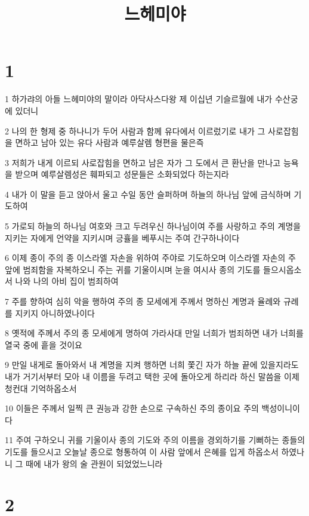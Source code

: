 

\title{느헤미야}


\chapter{1}

\par 1 하가랴의 아들 느헤미야의 말이라 아닥사스다왕 제 이십년 기슬르월에 내가 수산궁에 있더니
\par 2 나의 한 형제 중 하나니가 두어 사람과 함께 유다에서 이르렀기로 내가 그 사로잡힘을 면하고 남아 있는 유다 사람과 예루살렘 형편을 물은즉
\par 3 저희가 내게 이르되 사로잡힘을 면하고 남은 자가 그 도에서 큰 환난을 만나고 능욕을 받으며 예루살렘성은 훼파되고 성문들은 소화되었다 하는지라
\par 4 내가 이 말을 듣고 앉아서 울고 수일 동안 슬퍼하며 하늘의 하나님 앞에 금식하며 기도하여
\par 5 가로되 하늘의 하나님 여호와 크고 두려우신 하나님이여 주를 사랑하고 주의 계명을 지키는 자에게 언약을 지키시며 긍휼을 베푸시는 주여 간구하나이다
\par 6 이제 종이 주의 종 이스라엘 자손을 위하여 주야로 기도하오며 이스라엘 자손의 주 앞에 범죄함을 자복하오니 주는 귀를 기울이시며 눈을 여시사 종의 기도를 들으시옵소서 나와 나의 아비 집이 범죄하여
\par 7 주를 향하여 심히 악을 행하여 주의 종 모세에게 주께서 명하신 계명과 율례와 규례를 지키지 아니하였나이다
\par 8 옛적에 주께서 주의 종 모세에게 명하여 가라사대 만일 너희가 범죄하면 내가 너희를 열국 중에 흩을 것이요
\par 9 만일 내게로 돌아와서 내 계명을 지켜 행하면 너희 쫓긴 자가 하늘 끝에 있을지라도 내가 거기서부터 모아 내 이름을 두려고 택한 곳에 돌아오게 하리라 하신 말씀을 이제 청컨대 기억하옵소서
\par 10 이들은 주께서 일찍 큰 권능과 강한 손으로 구속하신 주의 종이요 주의 백성이니이다
\par 11 주여 구하오니 귀를 기울이사 종의 기도와 주의 이름을 경외하기를 기뻐하는 종들의 기도를 들으시고 오늘날 종으로 형통하여 이 사람 앞에서 은혜를 입게 하옵소서 하였나니 그 때에 내가 왕의 술 관원이 되었었느니라

\chapter{2}

